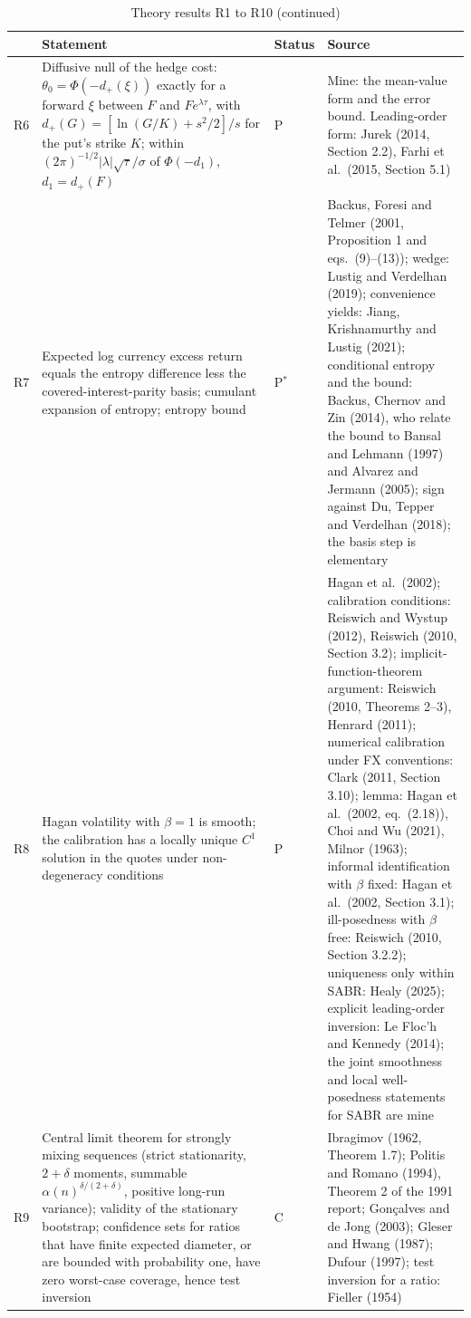 \documentclass[11pt]{article}
\theoremstyle{result}
\begin{document}
\clearpage
\addtocounter{table}{-1}
\begin{table}[H]
\centering\footnotesize
\caption{Theory results R1 to R10 (continued)}
\begin{tabularx}{\linewidth}{@{}l>{\raggedright\arraybackslash}X>{\raggedright\arraybackslash}p{1.55cm}>{\raggedright\arraybackslash}X@{}}
\toprule
 & Statement & Status & Source \\
\midrule
R6 & Diffusive null of the hedge cost: $\theta_0=\Phi(-d_+(\xi))$ exactly for a forward $\xi$ between $F$ and $Fe^{\lambda\tau}$, with $d_+(G)=[\ln(G/K)+s^2/2]/s$ for the put's strike $K$; within $(2\pi)^{-1/2}|\lambda|\sqrt\tau/\sigma$ of $\Phi(-d_1)$, $d_1=d_+(F)$ & P & Mine: the mean-value form and the error bound. Leading-order form: Jurek (2014, Section 2.2), Farhi et al.\ (2015, Section 5.1) \\
R7 & Expected log currency excess return equals the entropy difference less the covered-interest-parity basis; cumulant expansion of entropy; entropy bound & P$^*$ & Backus, Foresi and Telmer (2001, Proposition 1 and eqs.~(9)--(13)); wedge: Lustig and Verdelhan (2019); convenience yields: Jiang, Krishnamurthy and Lustig (2021); conditional entropy and the bound: Backus, Chernov and Zin (2014), who relate the bound to Bansal and Lehmann (1997) and Alvarez and Jermann (2005); sign against Du, Tepper and Verdelhan (2018); the basis step is elementary \\
R8 & Hagan volatility with $\beta=1$ is smooth; the calibration has a locally unique $C^1$ solution in the quotes under non-degeneracy conditions & P & Hagan et al.\ (2002); calibration conditions: Reiswich and Wystup (2012), Reiswich (2010, Section 3.2); implicit-function-theorem argument: Reiswich (2010, Theorems 2--3), Henrard (2011); numerical calibration under FX conventions: Clark (2011, Section 3.10); lemma: Hagan et al.\ (2002, eq.~(2.18)), Choi and Wu (2021), Milnor (1963); informal identification with $\beta$ fixed: Hagan et al.\ (2002, Section 3.1); ill-posedness with $\beta$ free: Reiswich (2010, Section 3.2.2); uniqueness only within SABR: Healy (2025); explicit leading-order inversion: Le Floc'h and Kennedy (2014); the joint smoothness and local well-posedness statements for SABR are mine \\
R9 & Central limit theorem for strongly mixing sequences (strict stationarity, $2+\delta$ moments, summable $\alpha(n)^{\delta/(2+\delta)}$, positive long-run variance); validity of the stationary bootstrap; confidence sets for ratios that have finite expected diameter, or are bounded with probability one, have zero worst-case coverage, hence test inversion & C & Ibragimov (1962, Theorem 1.7); Politis and Romano (1994), Theorem 2 of the 1991 report; Gon\c{c}alves and de Jong (2003); Gleser and Hwang (1987); Dufour (1997); test inversion for a ratio: Fieller (1954) \\
\bottomrule
\end{tabularx}
\end{table}
\end{document}
